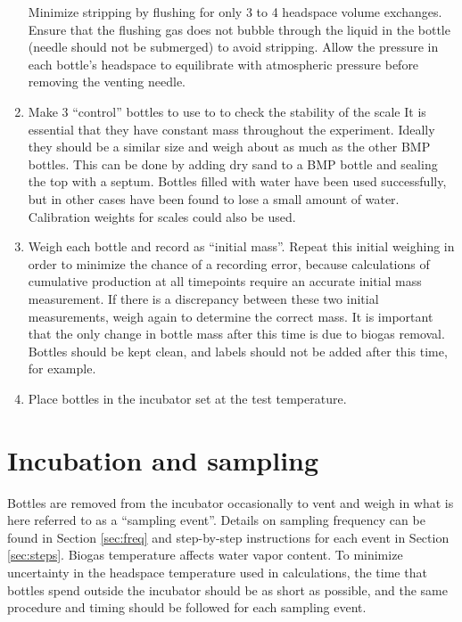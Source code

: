 \documentclass[]{article}
\begin{document}
\begin{enumerate}
{} 
      Minimize  stripping by flushing for only 3 to 4 headspace volume exchanges. 
      Ensure that the flushing gas does not bubble through the liquid in the bottle (needle should not be submerged) to avoid  stripping. 
      Allow the pressure in each bottle’s headspace to equilibrate with atmospheric pressure before removing the venting needle.
    \item Make 3 ``control'' bottles to use to to check the stability of the scale
      It is essential that they have constant mass throughout the experiment. 
      Ideally they should be a similar size and weigh about as much as the other BMP bottles.
      This can be done by adding dry sand to a BMP bottle and sealing the top with a septum. 
      Bottles filled with water have been used successfully, but in other cases have been found to lose a small amount of water.  
      Calibration weights for scales could also be used.
    \item Weigh each bottle and record as ``initial mass''. 
      Repeat this initial weighing in order to minimize the chance of a recording error, because calculations of cumulative  production at all timepoints require an accurate initial mass measurement.
      If there is a discrepancy between these two initial measurements, weigh again to determine the correct mass.
      It is important that the only change in bottle mass after this time is due to biogas removal.
      Bottles should be kept clean, and labels should not be added after this time, for example.
    \item Place bottles in the incubator set at the test temperature.
\end{enumerate}

\section{Incubation and sampling}
\label{sec:incsam}
Bottles are removed from the incubator occasionally to vent and weigh in what is here referred to as a ``sampling event''.
Details on sampling frequency can be found in Section \ref{sec:freq} and step-by-step instructions for each event in Section \ref{sec:steps}.
Biogas temperature affects water vapor content. 
To minimize uncertainty in the headspace temperature used in calculations, the time that bottles spend outside the incubator should be as short as possible, and the same procedure and timing should be followed for each sampling event. 
\end{document}
